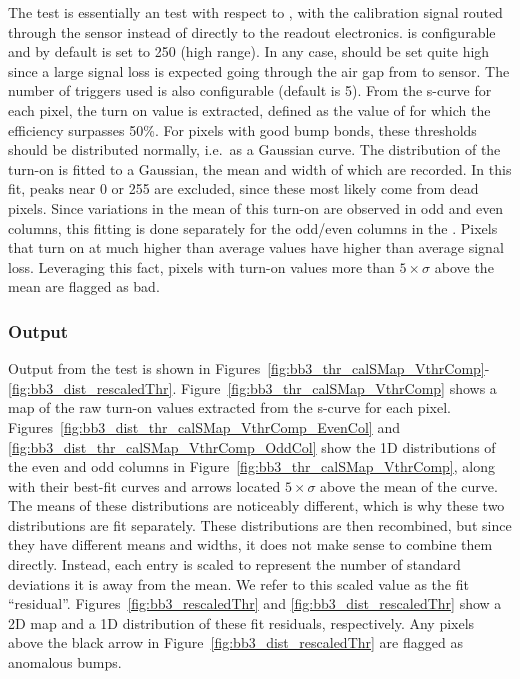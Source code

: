 The \bb test is essentially an \scurves test with respect to \vthrcomp, 
with the calibration signal routed through the sensor instead of directly to the readout electronics.
\vcal is configurable and by default is set to 250 (high range).
In any case, \vcal should be set quite high since a large signal loss is expected going through the air gap from \roc to sensor.
The number of triggers used is also configurable (default is 5).
From the \vthrcomp s-curve for each pixel, the turn on value is extracted, 
defined as the value of \vthrcomp for which the efficiency surpasses 50\%.
For pixels with good bump bonds, these thresholds should be distributed normally, i.e.~as a Gaussian curve.
The distribution of the \vthrcomp turn-on is fitted to a Gaussian, the mean and width of which are recorded.
In this fit, peaks near 0 or 255 are excluded, since these most likely come from dead pixels.
Since variations in the mean of this turn-on are observed in odd and even columns, 
this fitting is done separately for the odd/even columns in the \roc.
Pixels that turn on at much higher than average \vthrcomp values have higher than average signal loss.
Leveraging this fact, pixels with turn-on values more than $5\times\sigma$ above the mean are flagged as bad.

\subsubsection{Output}

Output from the \bb test is shown in Figures~\ref{fig:bb3_thr_calSMap_VthrComp}-\ref{fig:bb3_dist_rescaledThr}.
Figure~\ref{fig:bb3_thr_calSMap_VthrComp} shows a \roc map of the raw turn-on values extracted from the \vthrcomp s-curve for each pixel.
Figures~\ref{fig:bb3_dist_thr_calSMap_VthrComp_EvenCol} and \ref{fig:bb3_dist_thr_calSMap_VthrComp_OddCol} 
show the 1D distributions of the even and odd columns in Figure~\ref{fig:bb3_thr_calSMap_VthrComp}, 
along with their best-fit curves and arrows located $5\times\sigma$ above the mean of the curve.
The means of these distributions are noticeably different, which is why these two distributions are fit separately.
These distributions are then recombined, but since they have different means and widths,
it does not make sense to combine them directly.
Instead, each entry is scaled to represent the number of standard deviations it is away from the mean.
We refer to this scaled value as the fit ``residual''.
Figures~\ref{fig:bb3_rescaledThr} and \ref{fig:bb3_dist_rescaledThr} show a 2D \roc map and a 1D distribution of these fit residuals, respectively.
Any pixels above the black arrow in Figure~\ref{fig:bb3_dist_rescaledThr} are flagged as anomalous bumps.

